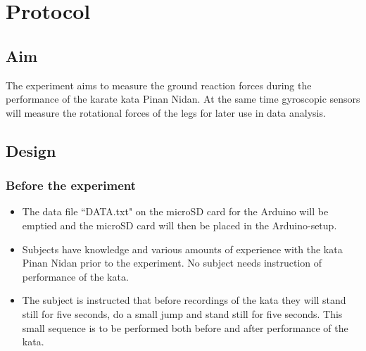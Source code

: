 \section{Protocol}
\subsection{Aim}
The experiment aims to measure the ground reaction forces during the performance of the karate kata Pinan Nidan. At the same time gyroscopic sensors will measure the rotational forces of the legs for later use in data analysis.

\subsection{Design}
\subsubsection{Before the experiment}
\begin{itemize}
\item The data file “DATA.txt" on the microSD card for the Arduino will be emptied and the microSD card will then be placed in the Arduino-setup. 
\item Subjects have knowledge and various amounts of experience with the kata Pinan Nidan prior to the experiment. No subject needs instruction of performance of the kata.
\item The subject is instructed that before recordings of the kata they will stand still for five seconds, do a small jump and stand still for five seconds. This small sequence is to be performed both before and after performance of the kata.
\end{itemize}


